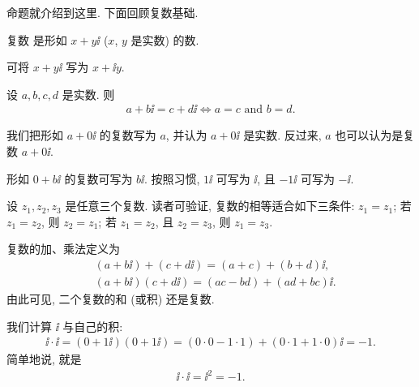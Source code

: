 命题就介绍到这里. 下面回顾复数基础.

\begin{definition}
    复数  是形如 $x + y \ii$ ($x$, $y$ 是实数) 的数.
\end{definition}

\begin{remark}
    可将 $x + y \ii$ 写为 $x + \ii y$.
\end{remark}

\begin{definition}
    设 $a,b,c,d$ 是实数. 则
    \begin{align*}
        a + b \ii = c + d \ii \iff a = c \text{ and } b = d.
    \end{align*}
\end{definition}

\begin{remark}
    我们把形如 $a+0 \ii$ 的复数写为 $a$, 并认为 $a+0 \ii$ 是实数. 反过来, $a$ 也可以认为是复数 $a + 0 \ii$.

    形如 $0 + b \ii$ 的复数可写为 $b \ii$. 按照习惯, $1\ii$ 可写为 $\ii$, 且 $-1\ii$ 可写为 $-\ii$.

    设 $z_1, z_2, z_3$ 是任意三个复数. 读者可验证, 复数的相等适合如下三条件: $z_1 = z_1$; 若 $z_1 = z_2$, 则 $z_2 = z_1$; 若 $z_1 = z_2$, 且 $z_2 = z_3$, 则 $z_1 = z_3$.
\end{remark}

\begin{definition}
    复数的加、乘法定义为
    \begin{align*}
         & (a + b \ii) + (c + d \ii) = (a + c) + (b + d) \ii,   \\
         & (a + b \ii) (c + d \ii) = (ac - bd) + (ad + bc) \ii.
    \end{align*}
    由此可见, 二个复数的和 (或积) 还是复数.
\end{definition}

\begin{example}
    我们计算 $\ii$ 与自己的积:
    \begin{align*}
        \ii \cdot \ii = (0 + 1\ii) (0 + 1\ii) = (0 \cdot 0 - 1 \cdot 1) + (0 \cdot 1 + 1 \cdot 0) \ii = -1.
    \end{align*}
    简单地说, 就是
    \begin{align*}
        \ii \cdot \ii = \ii^2 = -1.
    \end{align*}
\end{example}

